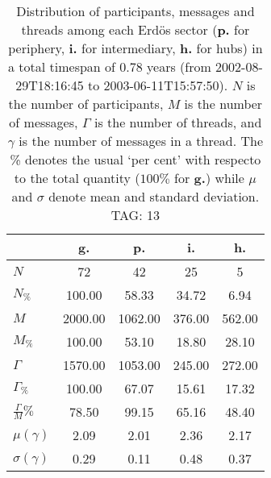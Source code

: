 \begin{table}[h!]
\begin{center}
\begin{tabular}{| l || c | c | c | c |}\hline
 & {\bf g.} & {\bf p.} & {\bf i.} & {\bf h.} \\\hline\hline
$N$ & 72  & 42  & 25  & 5 \\
$N_{\%}$ & 100.00  & 58.33  & 34.72  & 6.94 \\\hline
$M$ & 2000.00  & 1062.00  & 376.00  & 562.00 \\
$M_{\%}$ & 100.00  & 53.10  & 18.80  & 28.10 \\\hline
$\Gamma$ & 1570.00  & 1053.00  & 245.00  & 272.00 \\
$\Gamma_{\%}$ & 100.00  & 67.07  & 15.61  & 17.32 \\\hline
$\frac{\Gamma}{M}\%$ & 78.50  & 99.15  & 65.16  & 48.40 \\
$\mu(\gamma)$ & 2.09  & 2.01  & 2.36  & 2.17 \\
$\sigma(\gamma)$ & 0.29  & 0.11  & 0.48  & 0.37 \\\hline
\end{tabular}
\caption{Distribution of participants, messages and threads among each Erd\"os sector ({\bf p.} for periphery, {\bf i.} for intermediary, 
    {\bf h.} for hubs) in a total timespan of 0.78 years (from 2002-08-29T18:16:45 to 2003-06-11T15:57:50). $N$ is the number of participants, $M$ is the number of messages, $\Gamma$ is the number of threads, and $\gamma$ is the number of messages in a thread.
    The \% denotes the usual `per cent' with respecto to the total quantity ($100\%$ for {\bf g.})
    while $\mu$ and $\sigma$ denote mean and standard deviation. TAG: 13}
\end{center}
\end{table}